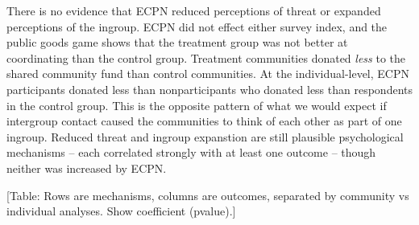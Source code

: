 \documentclass[]{article}
\begin{document}
There is no evidence that ECPN reduced perceptions of threat or expanded
perceptions of the ingroup. ECPN did not effect either survey index, and
the public goods game shows that the treatment group was not better at
coordinating than the control group. Treatment communities donated
\emph{less} to the shared community fund than control communities. At
the individual-level, ECPN participants donated less than
nonparticipants who donated less than respondents in the control group.
This is the opposite pattern of what we would expect if intergroup
contact caused the communities to think of each other as part of one
ingroup. Reduced threat and ingroup expanstion are still plausible
psychological mechanisms -- each correlated strongly with at least one
outcome -- though neither was increased by ECPN.

{[}Table: Rows are mechanisms, columns are outcomes, separated by
community vs individual analyses. Show coefficient (pvalue).{]}
\end{document}
